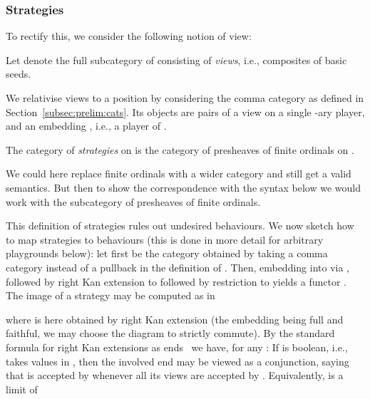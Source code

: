 \documentclass{LMCS}
\theoremstyle{plain}\newtheorem{satz}[thm]{Satz}
\begin{document}
\subsubsection{Strategies}\label{subsubsec:strategies}
To rectify this, we consider the following notion of view:
\begin{defi}
  Let  denote the full subcategory of  consisting of \emph{views}, i.e.,
  composites of basic seeds.
\end{defi}
We relativise views to a position  by considering the comma
category  as defined in Section~\ref{subsec:prelim:cats}.  Its
objects are pairs of a view  on a single -ary player,
and an embedding , i.e., a player of .

    \begin{defi}
     The category  of \emph{strategies} on  is the category
      of presheaves of finite ordinals on .
    \end{defi}
   \begin{rem}
     We could here replace finite ordinals with a wider category and
     still get a valid semantics. But then to show the correspondence
     with the syntax below we would work with the subcategory of
     presheaves of finite ordinals.
   \end{rem}
    
   This definition of strategies rules out undesired behaviours. We
   now sketch how to map strategies to behaviours (this is done in
   more detail for arbitrary playgrounds below): let first  be
   the category obtained by taking a comma category instead of a
   pullback in the definition of .  Then, embedding
    into  via ,
   followed by right Kan extension to  followed by
   restriction to  yields a functor . The image of a strategy  may be computed as in
    \begin{center}
    \end{center}
    where  is here obtained by right Kan extension (the embedding
     being full and faithful, we may
    choose the diagram to strictly commute).
    By the standard formula for right Kan extensions as
    ends~\citep{MacLane:cwm} we have, for any : 
     If  is boolean, i.e.,
    takes values in , then the involved end may be
    viewed as a conjunction, saying that  is accepted by 
    whenever all its views are accepted by .  Equivalently,
     is a limit of 
\end{document}
